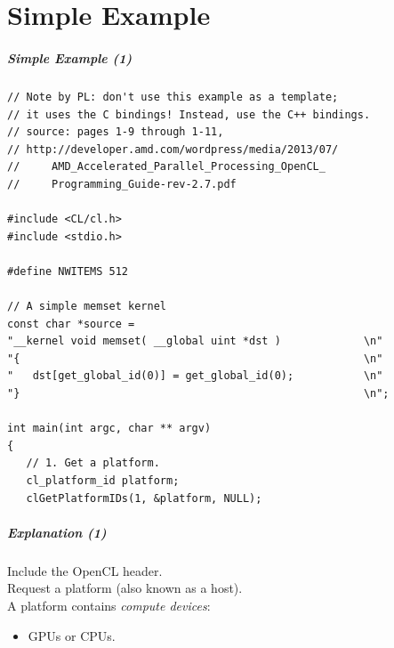 \part{Simple Example}
\frame{\partpage}
\begin{frame}[fragile]
  \frametitle{Simple Example (1)}


\begin{lstlisting}
// Note by PL: don't use this example as a template;
// it uses the C bindings! Instead, use the C++ bindings.
// source: pages 1-9 through 1-11,
// http://developer.amd.com/wordpress/media/2013/07/
//     AMD_Accelerated_Parallel_Processing_OpenCL_
//     Programming_Guide-rev-2.7.pdf

#include <CL/cl.h>
#include <stdio.h>

#define NWITEMS 512

// A simple memset kernel
const char *source =
"__kernel void memset( __global uint *dst )             \n"
"{                                                      \n"
"   dst[get_global_id(0)] = get_global_id(0);           \n"
"}                                                      \n";

int main(int argc, char ** argv)
{
   // 1. Get a platform.
   cl_platform_id platform;
   clGetPlatformIDs(1, &platform, NULL);
  \end{lstlisting}

\end{frame}

\begin{frame}
  \frametitle{Explanation (1)}


    Include the OpenCL header.\\[1em]

    Request a platform (also known as a host).\\[1em]

    A platform contains {\it compute devices}:
      \begin{itemize}
        \item GPUs or CPUs.
      \end{itemize}

\end{frame}

